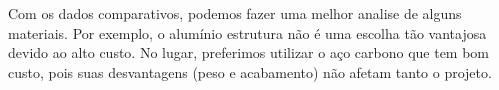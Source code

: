 	Com os dados comparativos, podemos fazer uma melhor analise de alguns materiais. Por exemplo, o alumínio estrutura não é uma escolha tão vantajosa devido ao alto custo. No lugar, preferimos utilizar o aço carbono que tem bom custo, pois suas desvantagens (peso e acabamento) não afetam tanto o projeto. 

	  